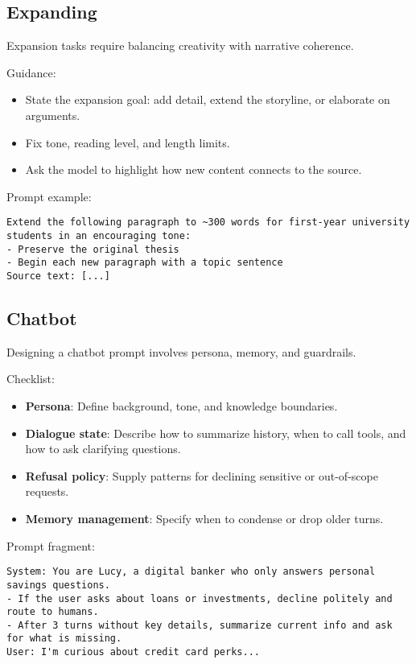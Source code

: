 ﻿\documentclass[12pt]{article}
\begin{document}
\subsection{Expanding}
Expansion tasks require balancing creativity with narrative coherence.

Guidance:
\begin{itemize}[leftmargin=*,itemsep=0.4em]
  \item State the expansion goal: add detail, extend the storyline, or elaborate on arguments.
  \item Fix tone, reading level, and length limits.
  \item Ask the model to highlight how new content connects to the source.
\end{itemize}

Prompt example:
\begin{verbatim}
Extend the following paragraph to ~300 words for first-year university students in an encouraging tone:
- Preserve the original thesis
- Begin each new paragraph with a topic sentence
Source text: [...]
\end{verbatim}

\subsection{Chatbot}
Designing a chatbot prompt involves persona, memory, and guardrails.

Checklist:
\begin{itemize}[leftmargin=*,itemsep=0.4em]
  \item \textbf{Persona}: Define background, tone, and knowledge boundaries.
  \item \textbf{Dialogue state}: Describe how to summarize history, when to call tools, and how to ask clarifying questions.
  \item \textbf{Refusal policy}: Supply patterns for declining sensitive or out-of-scope requests.
  \item \textbf{Memory management}: Specify when to condense or drop older turns.
\end{itemize}

Prompt fragment:
\begin{verbatim}
System: You are Lucy, a digital banker who only answers personal savings questions.
- If the user asks about loans or investments, decline politely and route to humans.
- After 3 turns without key details, summarize current info and ask for what is missing.
User: I'm curious about credit card perks...
\end{verbatim}
\end{document}
